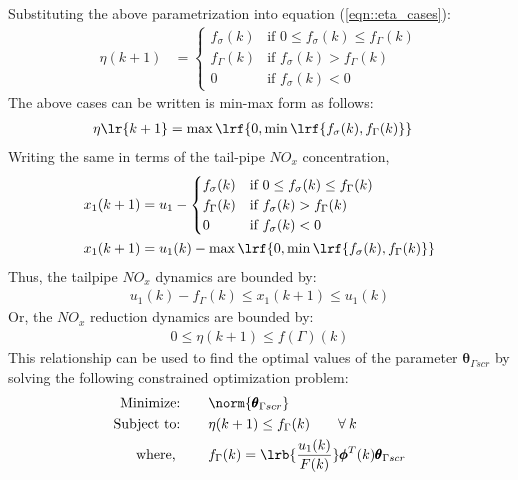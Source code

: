 Substituting the above parametrization into equation (\ref{eqn::eta_cases}):
\begin{align}
        \eta(k+1) &=
        \begin{cases}
                f_{\sigma}(k) & \text{if } 0 \leq f_{\sigma}(k) \leq f_{\Gamma}(k)\\
                f_{\Gamma}(k) & \text{if } f_{\sigma}(k) > f_{\Gamma}(k) \\
                0             & \text{if } f_{\sigma}(k) < 0
        \end{cases}
\end{align}
The above cases can be written is min-max form as follows:
\begin{align}
        \eta\lr{k + 1} &= \max \lrf{ 0, \min \lrf{f_{\sigma}(k), f_{\Gamma}(k)}}
\end{align}
Writing the same in terms of the tail-pipe $NO_x$ concentration,
\begin{align}
        x_1(k+1) &= u_1 -
        \begin{cases}
                f_{\sigma}(k) & \text{if } 0 \leq f_{\sigma}(k) \leq f_{\Gamma}(k)\\
                f_{\Gamma}(k) & \text{if } f_{\sigma}(k) > f_{\Gamma}(k) \\
                0             & \text{if } f_{\sigma}(k) < 0
        \end{cases}
        \\
        x_1(k+1) &= u_1(k) - \max \lrf{ 0, \min \lrf{f_{\sigma}(k), f_{\Gamma}(k)}}
\end{align}
Thus, the tailpipe $NO_x$ dynamics are bounded by:
\begin{align}
        u_1(k) - f_{\Gamma}(k) \leq x_1(k+1) \leq u_1(k)
\end{align}
Or, the $NO_x$ reduction dynamics are bounded by:
\begin{align}
        0 \leq \eta(k+1) \leq f(\Gamma)(k)
\end{align}
This relationship can be used to find the optimal values of the parameter $\pmb \theta_{\Gamma scr}$ by solving the following constrained optimization problem:
\begin{align*}
        \text{Minimize:}& \qquad  \norm{\pmb \theta_{\Gamma scr}} \\
        \text{Subject to:}& \qquad \eta(k+1) \leq f_\Gamma(k) \qquad \forall \: k \\
        \text{where, } & \qquad f_{\Gamma}(k) = \lrb{\frac{u_1(k)}{F(k)}} \pmb \phi^T(k)  \pmb \theta_{\Gamma scr}
\end{align*}
\begin{align}
        \label{eqn::optimization_prob}
\end{align}
